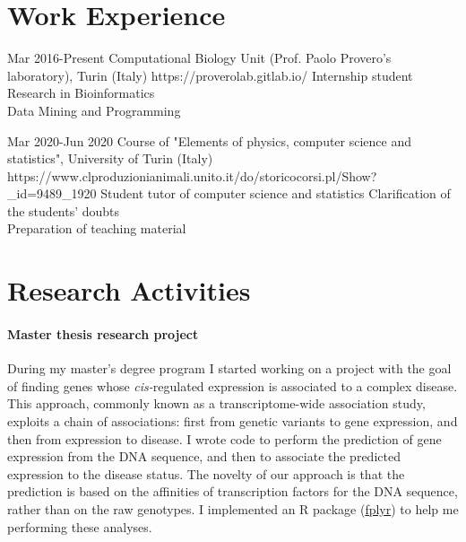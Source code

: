 \documentclass[10pt]{article} %
\begin{document}



\section{Work Experience}

\job
{Mar 2016-}{Present}
{Computational Biology Unit (Prof. Paolo Provero's laboratory), Turin (Italy)}
{https://proverolab.gitlab.io/}
{Internship student}
{
\bullet Research in Bioinformatics \\
\bullet Data Mining and Programming
}

\job
{Mar 2020-}{Jun 2020}
{Course of "Elements of physics, computer science and statistics", University of Turin (Italy)}
{https://www.clproduzionianimali.unito.it/do/storicocorsi.pl/Show?_id=9489_1920}
{Student tutor of computer science and statistics}
{
\bullet Clarification of the students' doubts \\
\bullet Preparation of teaching material
}

\section{Research Activities}

\paragraph{Master thesis research project}

During my master's degree program I started working on a project with the goal of finding genes whose \textit{cis-}regulated expression is associated to a complex disease. This approach, commonly known as a transcriptome-wide association study, exploits a chain of associations: first from genetic variants to gene expression, and then from expression to disease. I wrote code to perform the prediction of gene expression from the DNA sequence, and then to associate the predicted expression to the disease status. The novelty of our approach is that the prediction is based on the affinities of transcription factors for the DNA sequence, rather than on the raw genotypes. I implemented an R package (\href{https://cran.r-project.org/web/packages/fplyr/index.html}{fplyr}) to help me performing these analyses.
\end{document}
